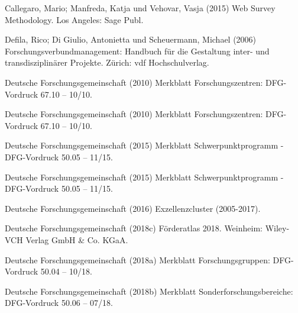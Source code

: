 \documentclass[a4paper,10pt,twoside]{article}
\begin{document}
\setlength{\parindent}{-0.2in}
\setlength{\leftskip}{0.2in}
\setlength{\parskip}{0pt}

\noindent

\hypertarget{refs}{}
\begin{CSLReferences}{0}{0}
\leavevmode\hypertarget{ref-callegaroWebSurveyMethodology2015}{}%
Callegaro, Mario; Manfreda, Katja und Vehovar, Vasja (2015) Web Survey Methodology. {Los Angeles}: {Sage Publ}.

\leavevmode\hypertarget{ref-defilaForschungsverbundmanagementHandbuchFur2006}{}%
Defila, Rico; Di Giulio, Antonietta und Scheuermann, Michael (2006) Forschungsverbundmanagement: Handbuch für die Gestaltung inter- und transdisziplinärer Projekte. {Zürich}: {vdf Hochschulverlag}.

\leavevmode\hypertarget{ref-deutscheforschungsgemeinschaftMerkblattForschungszentrenDFGVordruck2010}{}%
Deutsche Forschungsgemeinschaft (2010) Merkblatt {Forschungszentren}: {DFG}-{Vordruck} 67.10 -- 10/10.

\leavevmode\hypertarget{ref-deutscheforschungsgemeinschaftMerkblattForschungszentrenDFGVordruck2010}{}%
Deutsche Forschungsgemeinschaft (2010) Merkblatt {Forschungszentren}: {DFG}-{Vordruck} 67.10 -- 10/10.

\leavevmode\hypertarget{ref-deutscheforschungsgemeinschaftMerkblattSchwerpunktprogrammDFGVordruck2015}{}%
Deutsche Forschungsgemeinschaft (2015) Merkblatt {Schwerpunktprogramm} - {DFG}-{Vordruck} 50.05 -- 11/15.

\leavevmode\hypertarget{ref-deutscheforschungsgemeinschaftMerkblattSchwerpunktprogrammDFGVordruck2015}{}%
Deutsche Forschungsgemeinschaft (2015) Merkblatt {Schwerpunktprogramm} - {DFG}-{Vordruck} 50.05 -- 11/15.

\leavevmode\hypertarget{ref-deutscheforschungsgemeinschaftExzellenzcluster200520172016}{}%
Deutsche Forschungsgemeinschaft (2016) Exzellenzcluster (2005-2017).

\leavevmode\hypertarget{ref-deutscheforschungsgemeinschaftForderatlas20182018}{}%
Deutsche Forschungsgemeinschaft (2018c) Förderatlas 2018. {Weinheim}: {Wiley-VCH Verlag GmbH \& Co. KGaA}.

\leavevmode\hypertarget{ref-deutscheforschungsgemeinschaftMerkblattForschungsgruppenDFGVordruck2018a}{}%
Deutsche Forschungsgemeinschaft (2018a) Merkblatt {Forschungsgruppen}: {DFG}-{Vordruck} 50.04 -- 10/18.

\leavevmode\hypertarget{ref-deutscheforschungsgemeinschaftMerkblattSonderforschungsbereicheDFGVordruck2018}{}%
Deutsche Forschungsgemeinschaft (2018b) Merkblatt {Sonderforschungsbereiche}: {DFG}-{Vordruck} 50.06 -- 07/18.


\end{CSLReferences}
\end{document}
